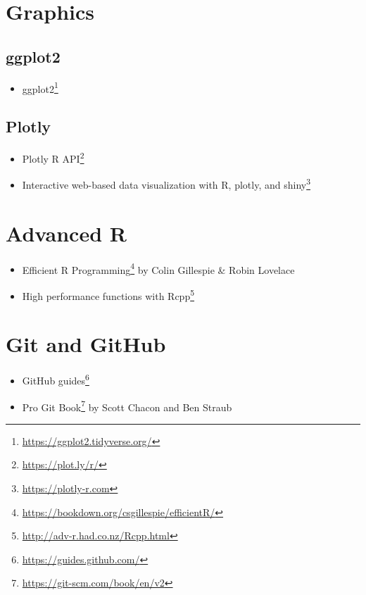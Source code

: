 \documentclass[
]{book}
\DeclareRobustCommand{\href}[2]{#2\footnote{\url{#1}}}
\providecommand{\tightlist}{%
  \setlength{\itemsep}{0pt}\setlength{\parskip}{0pt}}
\begin{document}
\hypertarget{graphics}{%
\section{Graphics}\label{graphics}}

\hypertarget{ggplot2-8}{%
\subsection{ggplot2}\label{ggplot2-8}}

\begin{itemize}
\tightlist
\item
  \href{https://ggplot2.tidyverse.org/}{ggplot2}
\end{itemize}

\hypertarget{plotly-2}{%
\subsection{Plotly}\label{plotly-2}}

\begin{itemize}
\tightlist
\item
  \href{https://plot.ly/r/}{Plotly R API}
\item
  \href{https://plotly-r.com}{Interactive web-based data visualization with R, plotly, and shiny}
\end{itemize}

\hypertarget{advanced-r}{%
\section{Advanced R}\label{advanced-r}}

\begin{itemize}
\tightlist
\item
  \href{https://bookdown.org/csgillespie/efficientR/}{Efficient R Programming} by Colin Gillespie \& Robin Lovelace
\item
  \href{http://adv-r.had.co.nz/Rcpp.html}{High performance functions with Rcpp}
\end{itemize}

\hypertarget{git-and-github}{%
\section{Git and GitHub}\label{git-and-github}}

\begin{itemize}
\tightlist
\item
  \href{https://guides.github.com/}{GitHub guides}
\item
  \href{https://git-scm.com/book/en/v2}{Pro Git Book} by Scott Chacon and Ben Straub
\end{itemize}
\end{document}
